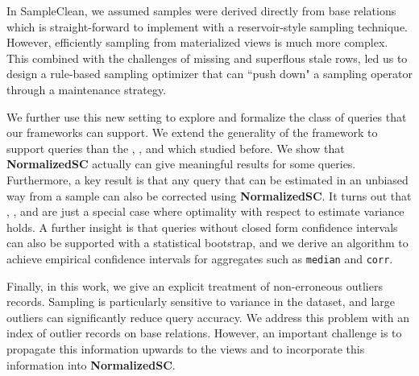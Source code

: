 In SampleClean, we assumed samples were derived directly from base relations which is straight-forward to implement with a reservoir-style sampling technique.
However, efficiently sampling from materialized views is much more complex.
This combined with the challenges of missing and superflous stale rows, led us to design a rule-based sampling optimizer that can ``push down" a sampling operator through a maintenance strategy.

We further use this new setting to explore and formalize the class of queries that our frameworks can support.
We extend the generality of the framework to support queries than the \sumfunc, \avgfunc, and \countfunc which studied before.
We show that \textbf{NormalizedSC} actually can give meaningful results for some \selectfunc queries.
Furthermore, a key result is that any query that can be estimated in an unbiased way from a sample can also be corrected using \textbf{NormalizedSC}.
It turns out that \sumfunc, \avgfunc, and \countfunc are just a special case where optimality with respect to estimate variance holds.
A further insight is that queries without closed form confidence intervals can also be supported with a statistical bootstrap, and we
derive an algorithm to achieve empirical confidence intervals for aggregates such as \texttt{median} and \texttt{corr}.

Finally, in this work, we give an explicit treatment of non-erroneous outliers records.
Sampling is particularly sensitive to variance in the dataset, and large outliers can significantly reduce query accuracy.
We address this problem with an index of outlier records on base relations.
However, an important challenge is to propagate this information upwards to the views and to incorporate this information into \textbf{NormalizedSC}.






